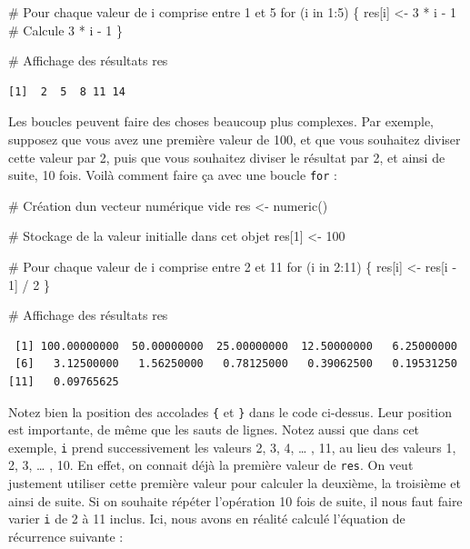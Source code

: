 \documentclass[
  french,
  a4paper,
  DIV=11,
  numbers=noendperiod,
  oneside]{scrreprt}
\newenvironment{Shaded}{}{}
\newcommand{\CommentTok}[1]{\textcolor[rgb]{0.42,0.45,0.49}{#1}}
\newcommand{\ControlFlowTok}[1]{\textcolor[rgb]{0.84,0.23,0.29}{#1}}
\newcommand{\DecValTok}[1]{\textcolor[rgb]{0.00,0.36,0.77}{#1}}
\newcommand{\FunctionTok}[1]{\textcolor[rgb]{0.44,0.26,0.76}{#1}}
\newcommand{\NormalTok}[1]{\textcolor[rgb]{0.14,0.16,0.18}{#1}}
\newcommand{\OtherTok}[1]{\textcolor[rgb]{0.44,0.26,0.76}{#1}}
\newcommand{\SpecialCharTok}[1]{\textcolor[rgb]{0.00,0.36,0.77}{#1}}
\begin{document}
\begin{tcolorbox}
\begin{Shaded}
\begin{Highlighting}[]
\CommentTok{\# Pour chaque valeur de i comprise entre 1 et 5}
\ControlFlowTok{for}\NormalTok{ (i }\ControlFlowTok{in} \DecValTok{1}\SpecialCharTok{:}\DecValTok{5}\NormalTok{) \{}
\NormalTok{  res[i] }\OtherTok{\textless{}{-}} \DecValTok{3} \SpecialCharTok{*}\NormalTok{ i }\SpecialCharTok{{-}} \DecValTok{1} \CommentTok{\# Calcule 3 * i {-} 1}
\NormalTok{\}}

\CommentTok{\# Affichage des résultats}
\NormalTok{res}
\end{Highlighting}
\end{Shaded}

\begin{verbatim}
[1]  2  5  8 11 14
\end{verbatim}

Les boucles peuvent faire des choses beaucoup plus complexes. Par
exemple, supposez que vous avez une première valeur de 100, et que vous
souhaitez diviser cette valeur par 2, puis que vous souhaitez diviser le
résultat par 2, et ainsi de suite, 10 fois. Voilà comment faire ça avec
une boucle \texttt{for} :

\begin{Shaded}
\begin{Highlighting}[]
\CommentTok{\# Création d\textquotesingle{}un vecteur numérique vide}
\NormalTok{res }\OtherTok{\textless{}{-}} \FunctionTok{numeric}\NormalTok{()}

\CommentTok{\# Stockage de la valeur initialle dans cet objet}
\NormalTok{res[}\DecValTok{1}\NormalTok{] }\OtherTok{\textless{}{-}} \DecValTok{100}

\CommentTok{\# Pour chaque valeur de i comprise entre 2 et 11}
\ControlFlowTok{for}\NormalTok{ (i }\ControlFlowTok{in} \DecValTok{2}\SpecialCharTok{:}\DecValTok{11}\NormalTok{) \{}
\NormalTok{  res[i] }\OtherTok{\textless{}{-}}\NormalTok{ res[i }\SpecialCharTok{{-}} \DecValTok{1}\NormalTok{] }\SpecialCharTok{/} \DecValTok{2}
\NormalTok{\}}

\CommentTok{\# Affichage des résultats}
\NormalTok{res}
\end{Highlighting}
\end{Shaded}

\begin{verbatim}
 [1] 100.00000000  50.00000000  25.00000000  12.50000000   6.25000000
 [6]   3.12500000   1.56250000   0.78125000   0.39062500   0.19531250
[11]   0.09765625
\end{verbatim}

Notez bien la position des accolades \texttt{\{} et \texttt{\}} dans le
code ci-dessus. Leur position est importante, de même que les sauts de
lignes. Notez aussi que dans cet exemple, \texttt{i} prend
successivement les valeurs 2, 3, 4, \ldots{} , 11, au lieu des valeurs
1, 2, 3, \ldots{} , 10. En effet, on connait déjà la première valeur de
\texttt{res}. On veut justement utiliser cette première valeur pour
calculer la deuxième, la troisième et ainsi de suite. Si on souhaite
répéter l'opération 10 fois de suite, il nous faut faire varier
\texttt{i} de 2 à 11 inclus. Ici, nous avons en réalité calculé
l'équation de récurrence suivante :


\end{tcolorbox}
\end{document}
